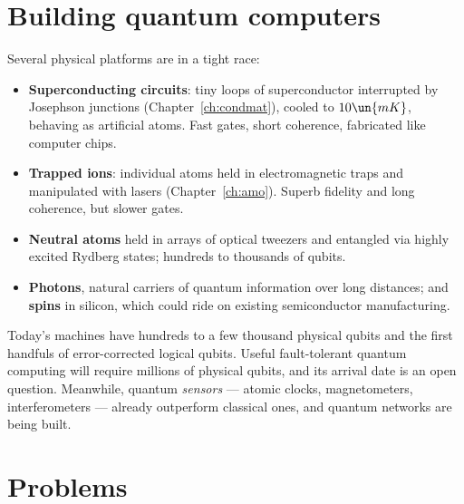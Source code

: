 \section{Building quantum computers}

Several physical platforms are in a tight race:
\begin{itemize}[itemsep=3pt]
  \item \textbf{Superconducting circuits}: tiny loops of superconductor interrupted by Josephson junctions (Chapter~\ref{ch:condmat}), cooled to $10\un{mK}$, behaving as artificial atoms. Fast gates, short coherence, fabricated like computer chips.
  \item \textbf{Trapped ions}: individual atoms held in electromagnetic traps and manipulated with lasers (Chapter~\ref{ch:amo}). Superb fidelity and long coherence, but slower gates.
  \item \textbf{Neutral atoms} held in arrays of optical tweezers and entangled via highly excited Rydberg states; hundreds to thousands of qubits.
  \item \textbf{Photons}, natural carriers of quantum information over long distances; and \textbf{spins} in silicon, which could ride on existing semiconductor manufacturing.
\end{itemize}
Today's machines have hundreds to a few thousand physical qubits and the first handfuls of error-corrected logical qubits. Useful fault-tolerant quantum computing will require millions of physical qubits, and its arrival date is an open question. Meanwhile, quantum \emph{sensors} --- atomic clocks, magnetometers, interferometers --- already outperform classical ones, and quantum networks are being built.

\section{Problems}

